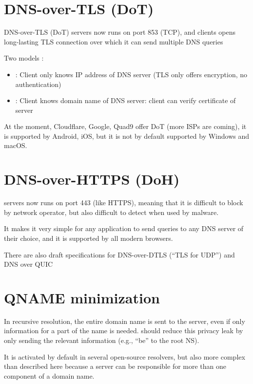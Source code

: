 \section{DNS-over-TLS (DoT)}

DNS-over-TLS (DoT) servers now runs on port 853 (TCP), and clients opens long-lasting TLS connection over which it can send multiple DNS queries

Two models :
\begin{itemize}
    \item {} : Client only knows IP address of DNS server (TLS only offers encryption, no authentication)
    \item {} : Client knows domain name of DNS server: client can verify certificate of server
\end{itemize}

At the moment, Cloudflare, Google, Quad9 offer DoT (more ISPs are coming), it is supported by Android, iOS, but it is not by default supported by Windows and macOS.

\section{DNS-over-HTTPS (DoH)}

 servers now runs on port 443 (like HTTPS), meaning that it is difficult to block by network operator, but also difficult to detect when used by malware.

It makes it very simple for any application to send queries to any
DNS server of their choice, and it is supported by all modern browsers.

There are also draft specifications for DNS-over-DTLS (“TLS for UDP”) and DNS over QUIC

\section{QNAME minimization}

In recursive resolution, the entire domain name is sent to the server, even if only information for a part of the name is needed.  should reduce this privacy leak by only sending the relevant information (e.g., “be” to the root NS).

It is activated by default in several open-source resolvers, but also more complex than described here because a server can be responsible for more than one component of a domain name.

